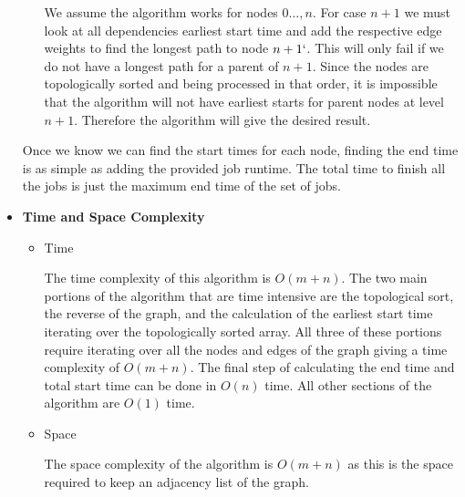 \documentclass[letterpaper,11pt]{article}
\begin{document}
\begin{itemize}
\begin{itemize}
                 We assume the algorithm works for nodes $0\ldots, n$. For case
                 $n + 1$ we must look at all dependencies earliest start time
                 and add the respective edge weights to find the longest path
                 to node $n + 1`$. This will only fail if we do not have a longest 
                 path for a parent of $n + 1$. Since the nodes are topologically 
                 sorted and being processed in that order, it is impossible that 
                 the algorithm will not have earliest starts for parent nodes
                 at level $n + 1$. Therefore the algorithm will give the desired
                 result.
         \end{itemize}

         Once we know we can find the start times for each node, finding the 
         end time is as simple as adding the provided job runtime. The total 
         time to finish all the jobs is just the maximum end time of the set 
         of jobs.

     \item \textbf{Time and Space Complexity}
         \begin{itemize}
             \item Time

                 The time complexity of this algorithm is $O\left( m + n \right) $.
                 The two main portions of the algorithm that are time intensive 
                 are the topological sort, the reverse of the graph, and the
                 calculation of the earliest start time iterating over the 
                 topologically sorted array. All three of these portions require
                 iterating over all the nodes and edges of the graph giving 
                 a time complexity of $O\left( m + n \right) $. The final step 
                 of calculating the end time and total start time can be done
                 in $O\left( n \right) $ time. All other sections of the algorithm
                 are $O\left( 1 \right) $ time.
             \item Space

                 The space complexity of the algorithm is $O\left( m + n  \right) $ 
                 as this is the space required to keep an adjacency list of 
                 the graph.
         \end{itemize}


\end{itemize}
\end{document}
